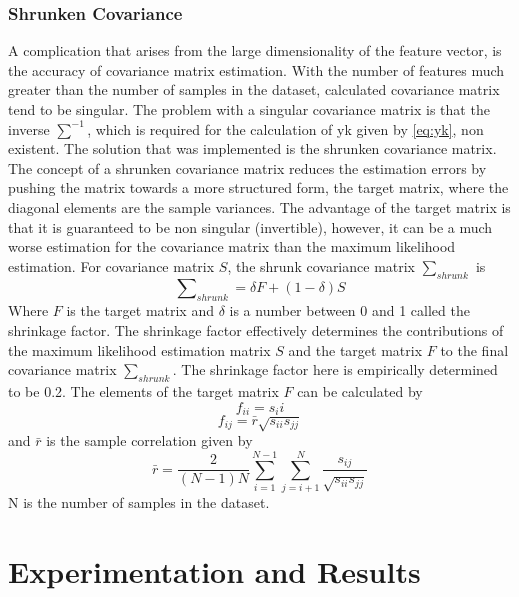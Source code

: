 \documentclass[12pt, a4paper, fleqn]{memoir}%
\begin{document}
\subsection{Shrunken Covariance}
A complication that arises from the large dimensionality of the feature vector, is the accuracy of covariance matrix estimation. With the number of features much greater than the number of samples in the dataset, calculated covariance matrix tend to be singular. The problem with a singular covariance matrix is that the inverse $\sum\nolimits^{-1}$, which is required for the calculation of yk given by \ref{eq:yk}, non existent. The solution that was implemented is the shrunken covariance matrix. The concept of a shrunken covariance matrix reduces the estimation errors by pushing the matrix towards a more structured form, the target matrix, where the diagonal elements are the sample variances\cite{disatnik2007shrinking}. The advantage of the target matrix is that it is guaranteed to be non singular (invertible), however, it can be a much worse estimation for the covariance matrix than the maximum likelihood estimation. For covariance matrix $S$, the shrunk covariance matrix $\sum\nolimits_{shrunk}$ is
\begin{equation}
	\label{eq:shrunkcov}
	\sum\nolimits_{shrunk} = \delta F + (1 - \delta)S
\end{equation}
Where $F$ is the target matrix and $\delta$ is a number between 0 and 1 called the shrinkage factor. The shrinkage factor effectively determines the contributions of the maximum likelihood estimation matrix $S$ and the target matrix $F$ to the final covariance matrix $\sum\nolimits_{shrunk}$. The shrinkage factor here is empirically determined to be 0.2. The elements of the target matrix $F$ can be calculated by 
\begin{equation}
	\label{eq:f}
	f_{ii} = s_ii
\end{equation}
\begin{equation}
	f_{ij} = \bar{r}\sqrt{s_{ii}s_{jj}}
\end{equation}
and $\bar{r}$ is the sample correlation given by
\begin{equation}
	\label{rbar}
	\bar{r} = \frac{2}{(N - 1)N}\sum^{N-1}_{i=1}\sum^{N}_{j=i+1}\frac{s_{ij}}{\sqrt{s_{ii}s_{jj}}}
\end{equation}
N is the number of samples in the dataset\cite{ledoit2004honey}.

\chapter{Experimentation and Results}
\label{chap:results}
\end{document}
